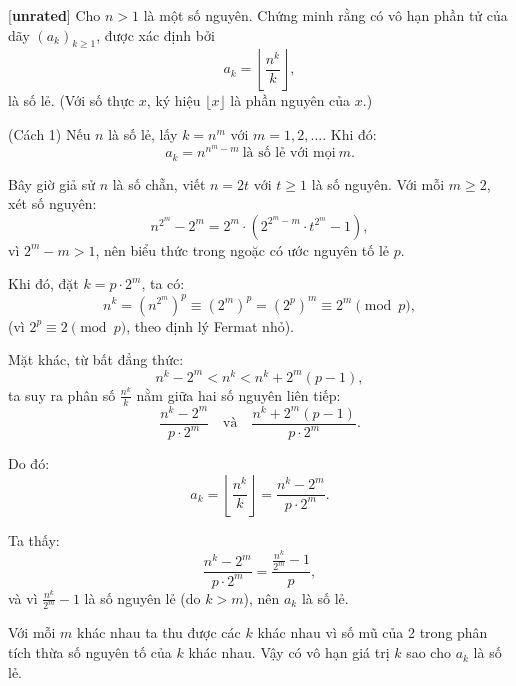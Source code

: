 \documentclass[../02-modular-arithmetic-b.tex]{subfiles}
\begin{document}
\begin{example*}\label{example:IND-2015-TST4-P3}[\textbf{unrated}]\footnotemark
	Cho \( n > 1 \) là một số nguyên. Chứng minh rằng có vô hạn phần tử của dãy \( (a_k)_{k \ge 1} \), được xác định bởi
	\[
		a_k = \left\lfloor \frac{n^k}{k} \right\rfloor,
	\]
	là số lẻ. (Với số thực \( x \), ký hiệu \( \lfloor x \rfloor \) là phần nguyên của \( x \).)
\end{example*}

\begin{soln}(Cách 1)
	Nếu \( n \) là số lẻ, lấy \( k = n^m \) với \( m = 1, 2, \dots \). Khi đó:
	\[
		a_k = n^{n^m-m}\ \text{là số lẻ với mọi}\ m.
	\]
	
	Bây giờ giả sử \( n \) là số chẵn, viết \( n = 2t \) với \( t \ge 1 \) là số nguyên. Với mỗi \( m \ge 2 \), xét số nguyên:
	\[
		n^{2^m} - 2^m = 2^m \cdot \left(2^{2^m - m} \cdot t^{2^m} - 1 \right),
	\]
	vì \( 2^m - m > 1 \), nên biểu thức trong ngoặc có ước nguyên tố lẻ \( p \).
	
	Khi đó, đặt \( k = p \cdot 2^m \), ta có:
	\[
		n^k = (n^{2^m})^p \equiv (2^{m})^p = (2^p)^{m} \equiv 2^{m} \pmod{p},
	\]
	(vì \( 2^p \equiv 2 \pmod{p} \), theo định lý Fermat nhỏ).
	
	Mặt khác, từ bất đẳng thức:
	\[
		n^k - 2^m < n^k < n^k + 2^m(p - 1),
	\]
	ta suy ra phân số \( \frac{n^k}{k} \) nằm giữa hai số nguyên liên tiếp:
	\[
		\frac{n^k - 2^m}{p \cdot 2^m} \quad \text{và} \quad \frac{n^k + 2^m(p - 1)}{p \cdot 2^m}.
	\]
	
	Do đó:
	\[
		a_k = \left\lfloor \frac{n^k}{k} \right\rfloor = \frac{n^k - 2^m}{p \cdot 2^m}.
	\]
	
	Ta thấy:
	\[
		\frac{n^k - 2^m}{p \cdot 2^m} = \frac{\frac{n^k}{2^m} - 1}{p},
	\]
	và vì \( \frac{n^k}{2^m} - 1 \) là số nguyên lẻ (do \( k > m \)), nên \( a_k \) là số lẻ.
	
	Với mỗi \( m \) khác nhau ta thu được các \( k \) khác nhau vì số mũ của 2 trong phân tích thừa số nguyên tố của \( k \) khác nhau.
	Vậy có vô hạn giá trị \( k \) sao cho \( a_k \) là số lẻ.
\end{soln}

\end{document}
